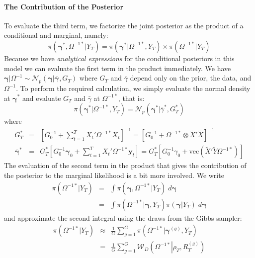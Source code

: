 \documentclass[12pt]{article}
\begin{document}
\paragraph{The Contribution of the Posterior}
To evaluate the third term, we factorize the joint posterior as the product of a conditional and marginal, namely:
\begin{equation*}
  \pi\left( \boldsymbol{\gamma}^*, \Omega^{-1*}|Y_T \right) = \pi\left( \boldsymbol{\gamma}^*|\Omega^{-1*},Y_T \right) \times \pi\left( \Omega^{-1*}|Y_T \right)
\end{equation*}
Because we have \emph{analytical expressions} for the conditional posteriors in this model we can evaluate the first term in the product immediately.
We have $\boldsymbol{\gamma}|\Omega^{-1} \sim \mathcal{N}_p\left( \boldsymbol{\gamma}|\bar{\boldsymbol{\gamma}}, G_T \right)$ where $G_T$ and $\bar{\gamma}$ depend only on the prior, the data, and $\Omega^{-1}$.
To perform the required calculation, we simply evaluate the normal density at $\boldsymbol{\gamma}^*$ and evaluate $G_T$ and $\bar{\gamma}$ at $\Omega^{-1*}$, that is:
\begin{equation*}
  \pi\left( \boldsymbol{\gamma}^*|\Omega^{-1*}, Y_T \right) = \mathcal{N}_p\left( \boldsymbol{\gamma}^*|\bar{\gamma}^*, G_T^*\right)
\end{equation*}
where
\begin{eqnarray*}
  G_T^* &=& \left[ G_0^{-1} + \sum_{t=1}^T X_t' \Omega^{-1*} X_t \right]^{-1} = \left[ G_0^{-1} + \Omega^{-1*} \otimes \widetilde{X}'\widetilde{X} \right]^{-1}\\
  \bar{\boldsymbol{\gamma}}^* &=& G_T^* \left[ G_0^{-1}\boldsymbol{\gamma}_0 + \sum_{t=1}^{T} X_t'\Omega^{-1*}\mathbf{y}_t \right] = G_T^* \left[ G_0^{-1}\gamma_0 + \mbox{vec}\left( \widetilde{X}'\widetilde{Y}\Omega^{-1*} \right) \right]
\end{eqnarray*}
The evaluation of the second term in the product that gives the contribution of the posterior to the marginal likelihood is a bit more involved.
We write
\begin{eqnarray*}
  \pi\left( \Omega^{-1*}|Y_T \right) &=&  \int \pi\left( \boldsymbol{\gamma},\Omega^{-1*}|Y_T \right) \; d\boldsymbol{\gamma}\\
  &=& \int \pi\left( \Omega^{-1*}|\boldsymbol{\gamma}, Y_T \right)\pi\left( \boldsymbol{\gamma}|Y_T \right)\; d\boldsymbol{\gamma}
\end{eqnarray*}
and approximate the second integral using the draws from the Gibbs sampler:
\begin{eqnarray*}
  \pi\left( \Omega^{-1*}|Y_T \right) &\approx& \frac{1}{G}\sum_{g=1}^G \pi\left( \Omega^{-1*}|\boldsymbol{\gamma}^{(g)},Y_T \right)\\
  &=& \frac{1}{G}\sum_{g=1}^G \mathcal{W}_D\left(\Omega^{-1*}\left|\rho_T, R_T^{\left( g \right)}\right. \right) 
\end{eqnarray*}
\end{document}
